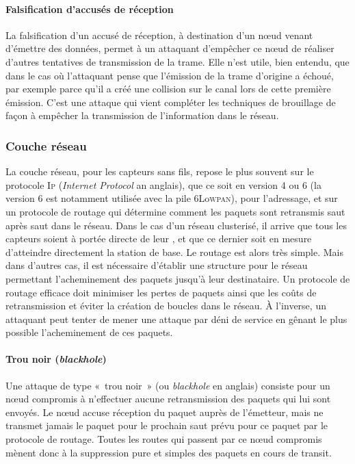         \paragraph{Falsification d'accusés de réception}
La falsification d'un accusé de réception, à destination d'un nœud venant d'émettre des données, permet à un attaquant d'empêcher ce nœud de réaliser d'autres tentatives de transmission de la trame.
Elle n'est utile, bien entendu, que dans le cas où l'attaquant pense que l'émission de la trame d'origine a échoué, par exemple parce qu'il a créé une collision sur le canal lors de cette première émission.
C'est une attaque qui vient compléter les techniques de brouillage de façon à empêcher la transmission de l'information dans le réseau.

    \subsubsection{Couche réseau}
La couche réseau, pour les capteurs sans fils, repose le plus souvent sur le protocole \textsc{Ip} (\textit{Internet Protocol} an anglais), que ce soit en version 4 ou 6 (la version 6 est notamment utilisée avec la pile 6Lo\textsc{wpan}), pour l'adressage, et sur un protocole de routage qui détermine comment les paquets sont retransmis saut après saut dans le réseau.
Dans le cas d'un réseau clusterisé, il arrive que tous les capteurs soient à portée directe de leur \ch, et que ce dernier soit en mesure d'atteindre directement la station de base.
Le routage est alors très simple.
Mais dans d'autres cas, il est nécessaire d'établir une structure pour le réseau permettant l'acheminement des paquets jusqu'à leur destinataire.
Un protocole de routage efficace doit minimiser les pertes de paquets ainsi que les coûts de retransmission et éviter la création de boucles dans le réseau.
À l'inverse, un attaquant peut tenter de mener une attaque par déni de service en gênant le plus possible l'acheminement de ces paquets.

        \paragraph{Trou noir (\textit{blackhole})}
Une attaque de type « trou noir » (ou \textit{blackhole} en anglais) consiste pour un nœud compromis à n'effectuer aucune retransmission des paquets qui lui sont envoyés.
Le nœud accuse réception du paquet auprès de l'émetteur, mais ne transmet jamais le paquet pour le prochain saut prévu pour ce paquet par le protocole de routage.
Toutes les routes qui passent par ce nœud compromis mènent donc à la suppression pure et simples des paquets en cours de transit.

